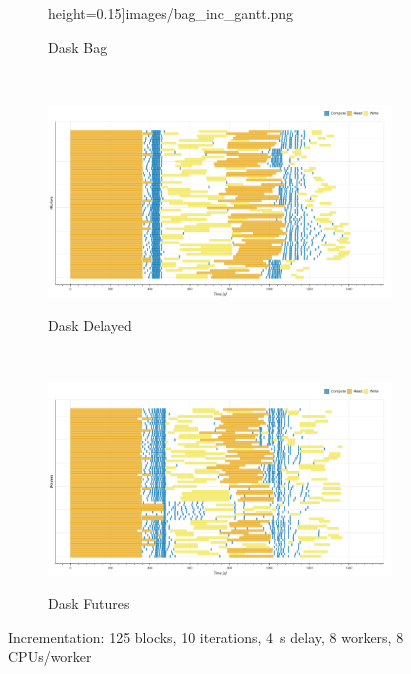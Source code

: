 \documentclass[conference]{IEEEtran}
\begin{document}
\begin{figure}[!b]
\begin{subfigure}[b]{\columnwidth}
{        height=0.15\textheight]{images/bag_inc_gantt.png}}
        \caption{Dask Bag}\label{fig:inc_dask_bag_gantt}
    \end{subfigure}
    \\
    \begin{subfigure}[b]{\columnwidth}
        \href{https://mathdugre.github.io/paper-big-data-engines/dask-delayed-inc-baseline.html}{
        \includegraphics[clip,width=\columnwidth,
        height=0.15\textheight]{images/delayed_inc_gantt.png}}
        \caption{Dask Delayed}\label{fig:inc_dask_delayed_gantt}
    \end{subfigure}
    \\
    \begin{subfigure}[b]{\columnwidth}
        \href{https://mathdugre.github.io/paper-big-data-engines/dask-futures-inc-baseline.html}{
        \includegraphics[clip,width=\columnwidth,
        height=0.15\textheight]{images/futures_inc_gantt.png}}
        \caption{Dask Futures}\label{fig:inc_dask_futures_gantt}
    \end{subfigure}
    \caption{Incrementation: 125 blocks, 10 iterations, \SI{4}{\second} delay, 8 workers,
8 CPUs/worker}\label{fig:inc_gantt}
\end{figure}
\end{document}
